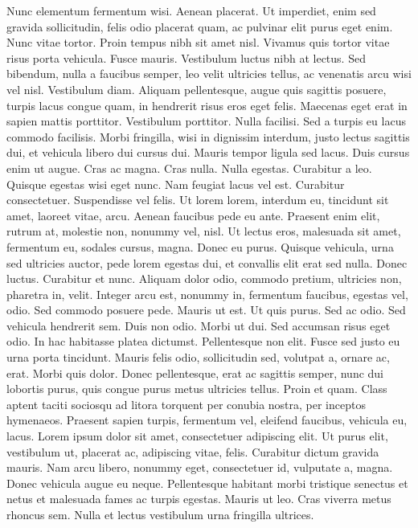 \documentclass[draft,12pt,twoside,a4paper]{book}
\begin{document}
Nunc elementum fermentum wisi.
Aenean placerat.
Ut imperdiet, enim sed gravida sollicitudin, felis odio placerat quam,
 ac pulvinar elit purus eget enim.
Nunc vitae tortor.
Proin tempus nibh sit amet nisl.
Vivamus quis tortor vitae risus porta vehicula.
Fusce mauris.
Vestibulum luctus nibh at lectus.
Sed bibendum, nulla a faucibus semper, leo velit ultricies tellus,
 ac venenatis arcu wisi vel nisl.
Vestibulum diam.
Aliquam pellentesque, augue quis sagittis posuere, turpis lacus congue quam,
 in hendrerit risus eros eget felis.
Maecenas eget erat in sapien mattis porttitor.
Vestibulum porttitor.
Nulla facilisi.
Sed a turpis eu lacus commodo facilisis.
Morbi fringilla, wisi in dignissim interdum, justo lectus sagittis dui,
 et vehicula libero dui cursus dui.
Mauris tempor ligula sed lacus.
Duis cursus enim ut augue.
Cras ac magna.
Cras nulla.
Nulla egestas.
Curabitur a leo.
Quisque egestas wisi eget nunc.
Nam feugiat lacus vel est.
Curabitur consectetuer.
Suspendisse vel felis.
Ut lorem lorem, interdum eu, tincidunt sit amet, laoreet vitae, arcu.
Aenean faucibus pede eu ante.
Praesent enim elit, rutrum at, molestie non, nonummy vel, nisl.
Ut lectus eros, malesuada sit amet, fermentum eu, sodales cursus, magna.
Donec eu purus.
Quisque vehicula, urna sed ultricies auctor, pede lorem egestas dui,
 et convallis elit erat sed nulla.
Donec luctus.
Curabitur et nunc.
Aliquam dolor odio, commodo pretium, ultricies non, pharetra in, velit.
Integer arcu est, nonummy in, fermentum faucibus, egestas vel, odio.
Sed commodo posuere pede.
Mauris ut est.
Ut quis purus.
Sed ac odio.
Sed vehicula hendrerit sem.
Duis non odio.
Morbi ut dui.
Sed accumsan risus eget odio.
In hac habitasse platea dictumst.
Pellentesque non elit.
Fusce sed justo eu urna porta tincidunt.
Mauris felis odio, sollicitudin sed, volutpat a, ornare ac, erat.
Morbi quis dolor.
Donec pellentesque, erat ac sagittis semper, nunc dui lobortis purus,
 quis congue purus metus ultricies tellus.
Proin et quam.
Class aptent taciti sociosqu ad litora torquent per conubia nostra,
 per inceptos hymenaeos.
Praesent sapien turpis, fermentum vel, eleifend faucibus, vehicula eu, lacus.
Lorem ipsum dolor sit amet, consectetuer adipiscing elit.
Ut purus elit, vestibulum ut, placerat ac, adipiscing vitae, felis.
Curabitur dictum gravida mauris.
Nam arcu libero, nonummy eget, consectetuer id, vulputate a, magna.
Donec vehicula augue eu neque.
Pellentesque habitant morbi tristique senectus et netus et malesuada
 fames ac turpis egestas.
Mauris ut leo.
Cras viverra metus rhoncus sem.
Nulla et lectus vestibulum urna fringilla ultrices.
\end{document}
